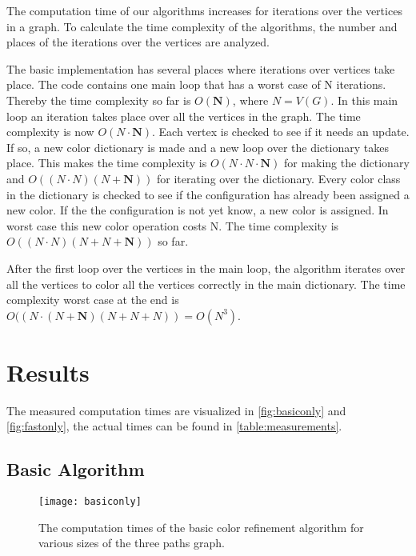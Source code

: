 \documentclass[twoside]{article}
\begin{document}
\begin{multicols}{2}
The computation time of our algorithms increases for iterations over the vertices in a graph. To calculate the time complexity of the algorithms, the number and places of the iterations over the vertices are analyzed. 

The basic implementation has several places where iterations over vertices take place. The code contains one main loop that has a worst case of N iterations. Thereby the time complexity so far is $O(\boldsymbol{N})$, where $N = V(G)$. In this main loop an iteration takes place over all the vertices in the graph. The time complexity is now $O(N \cdot \boldsymbol{N})$. Each vertex is checked to see if it needs an update. If so, a new color dictionary is made and a new loop over the dictionary takes place. This makes the time complexity is $O(N \cdot N \cdot \boldsymbol{N})$ for making the dictionary and $O((N \cdot N)(N+\boldsymbol{N}))$ for iterating over the dictionary. Every color class in the dictionary is checked to see if the configuration has already been assigned a new color. If the the configuration is not yet know, a new color is assigned. In worst case this new color operation costs N. The time complexity is $O((N \cdot N)(N+N+\boldsymbol{N}))$ so far.

After the first loop over the vertices in the main loop, the algorithm iterates over all the vertices to color all the vertices correctly in the main dictionary. The time complexity worst case at the end is $O((N \cdot (N+\boldsymbol{N})(N+N+N)) = O(N^3)$.

\section{Results}
\label{results}
The measured computation times are visualized in \autoref{fig:basiconly} and \autoref{fig:fastonly}, the actual times can be found in \autoref{table:measurements}.

\subsection{Basic Algorithm}


\begin{figure}[H]
	\texttt{[image: basiconly]}
	\caption{The computation times of the basic color refinement algorithm for various sizes of the three paths graph.}
	\label{fig:basiconly}
\end{figure}


\end{multicols}
\end{document}
